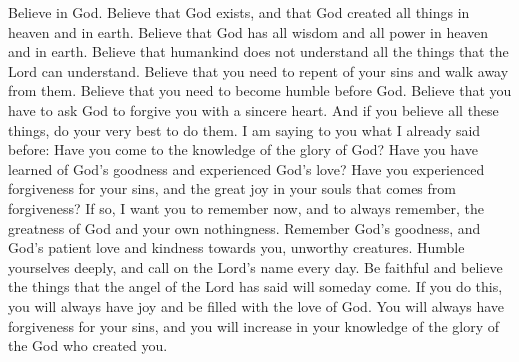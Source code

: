 Believe in God. Believe that God exists, and that God created all things in heaven and in earth. Believe that God has all wisdom and all power in heaven and in earth. Believe that humankind does not understand all the things that the Lord can understand.
\bverse \iffalse And again, believe that ye must repent of your sins and forsake them, and humble yourselves before God; and ask in sincerity of heart that he would forgive you; and now, if you believe all these things see that ye do them. \fi
Believe that you need to repent of your sins and walk away from them. Believe that you need to become humble before God. Believe that you have to ask God to forgive you with a sincere heart. And if you believe all these things, do your very best to do them.
\bverse \iffalse And again I say unto you as I have said before, that as ye have come to the knowledge of the glory of God, or if ye have known of his goodness and have tasted of his love, and have received a remission of your sins, which causeth such exceedingly great joy in your souls, even so I would that ye should remember, and always retain in remembrance, the greatness of God, and your own nothingness, and his goodness and long-suffering towards you, unworthy creatures, and humble yourselves even in the depths of humility, calling on the name of the Lord daily, and standing steadfastly in the faith of that which is to come, which was spoken by the mouth of the angel. \fi
I am saying to you what I already said before: Have you come to the knowledge of the glory of God? Have you have learned of God's goodness and experienced God's love? Have you experienced forgiveness for your sins, and the great joy in your souls that comes from forgiveness? If so, I want you to remember now, and to always remember, the greatness of God and your own nothingness. Remember God's goodness, and God's patient love and kindness towards you, unworthy creatures. Humble yourselves deeply, and call on the Lord's name every day. Be faithful and believe the things that the angel of the Lord has said will someday come.
\bverse \iffalse And behold, I say unto you that if ye do this ye shall always rejoice, and be filled with the love of God, and always retain a remission of your sins; and ye shall grow in the knowledge of the glory of him that created you, or in the knowledge of that which is just and true. \fi
If you do this, you will always have joy and be filled with the love of God. You will always have forgiveness for your sins, and you will increase in your knowledge of the glory of the God who created you.

